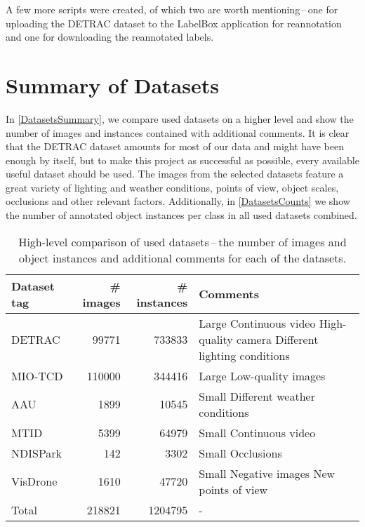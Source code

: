 A few more scripts were created, of which two are worth mentioning\,--\,one for
uploading the DETRAC dataset to the LabelBox application for reannotation and
one for downloading the reannotated labels.


\section{Summary of Datasets}

In \autoref{DatasetsSummary}, we compare used datasets on a higher level and
show the number of images and instances contained with additional comments. It
is clear that the DETRAC dataset amounts for most of our
data and might have been enough by itself, but to make this project as
successful as possible, every available useful dataset should be used. The
images from the selected datasets feature a great variety of lighting and
weather conditions, points of view, object scales, occlusions and other relevant factors.
Additionally, in \autoref{DatasetsCounts} we show the number of annotated object
instances per class in all used datasets combined.

\begin{table}[h]
\centering
\begin{tabular}{|l|rr|p{5cm}|}
    \hline
    Dataset tag & \# images & \# instances & Comments \\
    \hline
    DETRAC      &  \num{99771}  & \num{733833} & Large \newline Continuous video \newline High-quality camera \newline Different lighting conditions \\
    \hline
    MIO-TCD     &  \num{110000} & \num{344416} & Large \newline Low-quality images \\
    \hline
    AAU         &    \num{1899} &  \num{10545} & Small \newline Different weather conditions \\
    \hline
    MTID        &    \num{5399} &  \num{64979} & Small \newline Continuous video \\
    \hline
    NDISPark    &     \num{142} &   \num{3302} & Small \newline Occlusions \\
    \hline
    VisDrone    &    \num{1610} &  \num{47720} & Small \newline Negative images \newline New points of view \\
    \hline
    \hline
    Total       &  \num{218821} & \num{1204795} & - \\
    \hline
\end{tabular}
\caption{High-level comparison of used datasets\,--\,the number of images and object instances and additional comments for each of the datasets.}
\label{DatasetsSummary}
\end{table}

